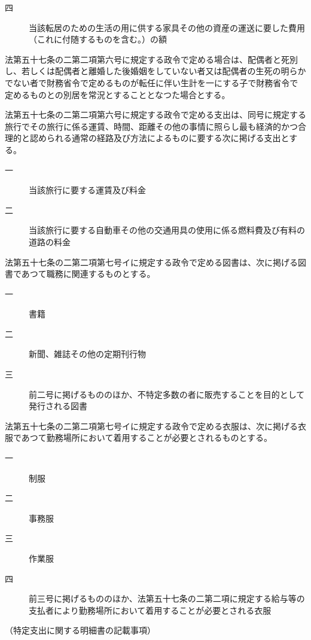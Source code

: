 \documentclass[twocolumn,a4j,10pt]{ltjtarticle}
\begin{document}
\begin{description}
\begin{description}
\item[四]当該転居のための生活の用に供する家具その他の資産の運送に要した費用（これに付随するものを含む。）の額
\end{description}
\item[\rensuji{4}]法第五十七条の二第二項第六号に規定する政令で定める場合は、配偶者と死別し、若しくは配偶者と離婚した後婚姻をしていない者又は配偶者の生死の明らかでない者で財務省令で定めるものが転任に伴い生計を一にする子で財務省令で定めるものとの別居を常況とすることとなつた場合とする。
\item[\rensuji{5}]法第五十七条の二第二項第六号に規定する政令で定める支出は、同号に規定する旅行でその旅行に係る運賃、時間、距離その他の事情に照らし最も経済的かつ合理的と認められる通常の経路及び方法によるものに要する次に掲げる支出とする。
\begin{description}
\item[一]当該旅行に要する運賃及び料金
\item[二]当該旅行に要する自動車その他の交通用具の使用に係る燃料費及び有料の道路の料金
\end{description}
\item[\rensuji{6}]法第五十七条の二第二項第七号イに規定する政令で定める図書は、次に掲げる図書であつて職務に関連するものとする。
\begin{description}
\item[一]書籍
\item[二]新聞、雑誌その他の定期刊行物
\item[三]前二号に掲げるもののほか、不特定多数の者に販売することを目的として発行される図書
\end{description}
\item[\rensuji{7}]法第五十七条の二第二項第七号イに規定する政令で定める衣服は、次に掲げる衣服であつて勤務場所において着用することが必要とされるものとする。
\begin{description}
\item[一]制服
\item[二]事務服
\item[三]作業服
\item[四]前三号に掲げるもののほか、法第五十七条の二第二項に規定する給与等の支払者により勤務場所において着用することが必要とされる衣服
\end{description}
\end{description}
\noindent\hspace{10pt}（特定支出に関する明細書の記載事項）
\end{document}
